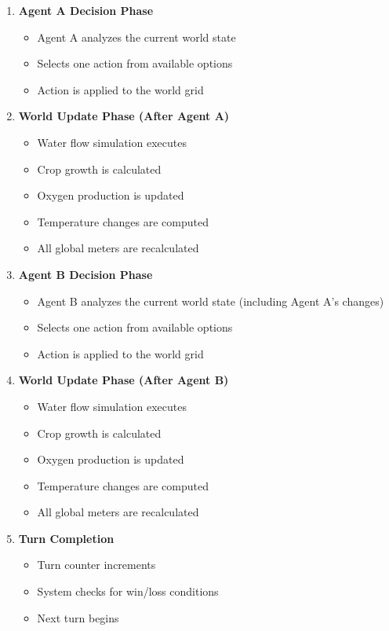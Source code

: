 \documentclass[12pt,a4paper]{article}
\begin{document}
\begin{enumerate}[leftmargin=2cm]
    \item \textbf{Agent A Decision Phase}
    \begin{itemize}
        \item Agent A analyzes the current world state
        \item Selects one action from available options
        \item Action is applied to the world grid
    \end{itemize}
    
    \item \textbf{World Update Phase (After Agent A)}
    \begin{itemize}
        \item Water flow simulation executes
        \item Crop growth is calculated
        \item Oxygen production is updated
        \item Temperature changes are computed
        \item All global meters are recalculated
    \end{itemize}
    
    \item \textbf{Agent B Decision Phase}
    \begin{itemize}
        \item Agent B analyzes the current world state (including Agent A's changes)
        \item Selects one action from available options
        \item Action is applied to the world grid
    \end{itemize}
    
    \item \textbf{World Update Phase (After Agent B)}
    \begin{itemize}
        \item Water flow simulation executes
        \item Crop growth is calculated
        \item Oxygen production is updated
        \item Temperature changes are computed
        \item All global meters are recalculated
    \end{itemize}
    
    \item \textbf{Turn Completion}
    \begin{itemize}
        \item Turn counter increments
        \item System checks for win/loss conditions
        \item Next turn begins
    \end{itemize}
\end{enumerate}
\end{document}
